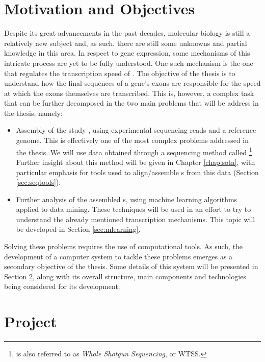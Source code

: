 \section{Motivation and Objectives} \label{sec:motivation}

Despite its great advancements in the past decades, molecular biology is still a
relatively new subject and, as such, there are still some unknowns and partial
knowledge in this area. In respect to gene expression, some mechanisms of this
intricate process are yet to be fully understood. One such mechanism is the one
that regulates the transcription speed of \rna. The objective of the thesis is
to understand how the final sequences of a gene's exons are responsible for the
speed at which the exons themselves are transcribed. This is, however, a complex
task that can be further decomposed in the two main problems that will be
address in the thesis, namely:

\begin{itemize}

  \item
  Assembly of the study \trans, using experimental sequencing reads and a
  reference genome. This is effectively one of the most complex problems
  addressed in the thesis. We will use data obtained through a sequencing method
  called \rnaseq{}\footnote{\rnaseq{} is also referred to as \textit{Whole \Trans{}
  Shotgun Sequencing}, or WTSS.}. Further insight about this method will be
  given in Chapter \ref{chap:sota}, with particular emphasis for tools used to
  align/assemble \trans s from this data (Section \ref{sec:seqtools}).

  \item
  Further analysis of the assembled \trans s, using machine learning algorithms
  applied to data mining. These techniques will be used in an effort to try to
  understand the already mentioned transcription mechanisms. This topic will be
  developed in Section \ref{sec:mlearning}.

\end{itemize}

Solving these problems requires the use of computational tools. As such, the
development of a computer system to tackle these problems emerges as a secondary
objective of the thesis. Some details of this system will be presented in
Section \ref{sec:project}, along with its overall structure, main components and
technologies being considered for its development.

\section{Project} \label{sec:project}

